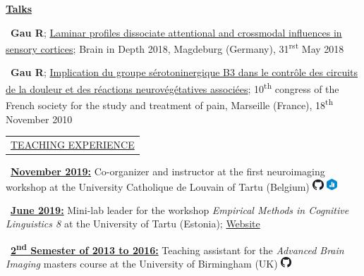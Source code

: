 \documentclass[a4paper,12pt,oneside]{letter}
\begin{document}
{\begin{center}
 \href{https://osf.io/4h63t/}{\large\textbf{Talks}}
\end{center}

\textbullet~\textbf{Gau R}; \href{https://figshare.com/s/06d360f8ec1be9431f6e}{Laminar profiles dissociate attentional and crossmodal influences in sensory cortices}; Brain in Depth 2018, Magdeburg (Germany), 31\textsuperscript{rst} May 2018

\textbullet~\textbf{Gau R}; \href{http://www.researchgate.net/profile/Remi_Gau/publication/312084405_Implication_du_groupe_serotoninergique_B3_dans_le_controle_des_circuits_de_la_douleur_et_des_reactions_neurovegetatives_associees/links/586e5f4a08ae6eb871bcfcc2?origin=publication_detail&ev=pub_int_prw_xdl&msrp=fq7qspniFbcYB53CbrroAtz2DNXxUJar7CmckJaw6O2YzI7LWasFAW99t9G74Z5sL-KLoJT2Dqv8D075R3ghy55Fy6xPne3_ARZvM87O3Ao.5ii75N_9y4vKCns-VUuTTDNhKb6ruhYALqaObgtdOB4WIkUSArh9tdzN9AtPRWz68YGcjTb3scxfWZy6tYxnSg.naSDUCbUZHM6gF6BaFbjpF3ARcyIPTBh1UsuA1cVoOZQsoPMn9YGNC2UsgdGA0P28xoO8bXY1221-tRVtfrUZA}{Implication du groupe sérotoninergique B3 dans le contrôle des circuits de la douleur et des réactions neurovégétatives associées}; 10\textsuperscript{th} congress of the French society for the study and treatment of pain, Marseille (France), 18\textsuperscript{th} November 2010


\medskip 

\begin{tabular}{B}
 \underline{TEACHING EXPERIENCE}
\end{tabular}

\textbullet~\underline{\textbf{November 2019:}} 	Co-organizer and instructor at the first neuroimaging workshop at the University Catholique de Louvain of Tartu (Belgium) \href{https://github.com/cpp-lln-lab/fMRI_workshop_201911}{{\includegraphics[width=0.4cm]{github.png}}} \href{https://doi.org/10.5281/zenodo.3548325}{\includegraphics[width=0.4cm]{data_small_color.png}}

\textbullet~\underline{\textbf{June 2019:}} 	Mini-lab leader for the workshop \textit{Empirical Methods in Cognitive Linguistics 8} at the University of Tartu (Estonia); \href{https://sisu.ut.ee/emcl8tartu/emcl-organising-committee}{Website}

\textbullet~\underline{\textbf{2\textsuperscript{nd} Semester of 2013 to 2016:}} 	Teaching assistant for the \textit{Advanced Brain Imaging} masters course at the University of Birmingham (UK) \href{https://github.com/Remi-Gau/advanced_fMRI_course}{{\includegraphics[width=0.4cm]{github.png}}}

}
\end{document}
